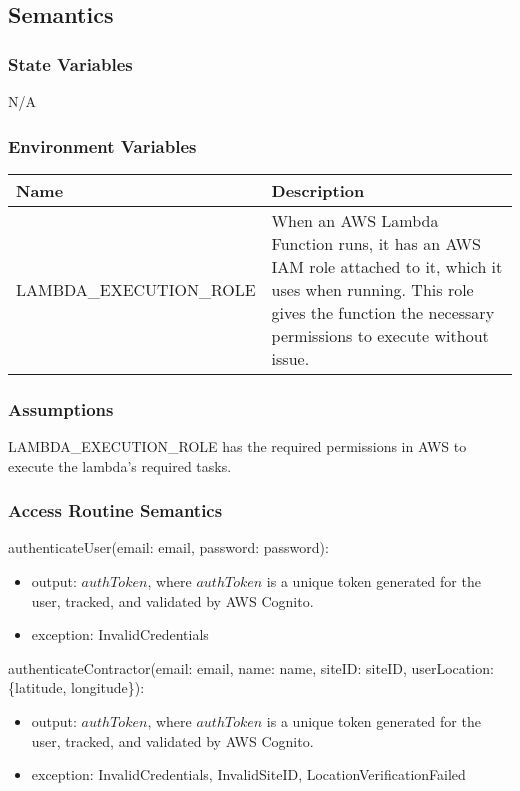 \documentclass[12pt, titlepage]{article}
\begin{document}
{  \subsection{Semantics}

  \subsubsection{State Variables}

  N/A

  \subsubsection{Environment Variables}

  \begin{center}
    \begin{tabular}{p{6cm} p{10cm}}
      \hline
      \textbf{Name} & \textbf{Description} \\
      \hline
      LAMBDA\_EXECUTION\_ROLE & When an AWS Lambda Function runs, it
      has an AWS IAM role attached to it, which it uses when running.
      This role gives the function the necessary permissions to execute
      without issue. \\
      \hline
    \end{tabular}
  \end{center}

  \subsubsection{Assumptions}

  LAMBDA\_EXECUTION\_ROLE has the required permissions in AWS to
  execute the lambda's required tasks.

  \subsubsection{Access Routine Semantics}

  \noindent authenticateUser(email: email, password: password):
  \begin{itemize}
    \item output: $authToken$, where $authToken$ is a unique token
      generated for the user, tracked, and validated by AWS Cognito.
    \item exception: InvalidCredentials
  \end{itemize}

  \noindent authenticateContractor(email: email, name: name, siteID:
  siteID, userLocation: \{latitude, longitude\}):
  \begin{itemize}
    \item output: $authToken$, where $authToken$ is a unique token
      generated for the user, tracked, and validated by AWS Cognito.
    \item exception: InvalidCredentials, InvalidSiteID,
      LocationVerificationFailed
  \end{itemize}

}
\end{document}

